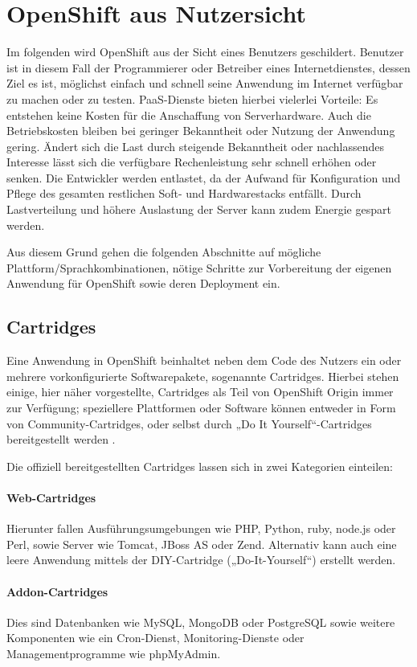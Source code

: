 \documentclass[10pt,a4paper,compsoc]{IEEEtran}
\begin{document}
\section{OpenShift aus Nutzersicht}
\label{sec:user}
Im folgenden wird OpenShift aus der Sicht eines Benutzers geschildert. Benutzer ist in diesem Fall der Programmierer oder Betreiber eines Internetdienstes, dessen Ziel es ist, möglichst einfach und schnell seine Anwendung im Internet verfügbar zu machen oder zu testen. PaaS-Dienste bieten hierbei vielerlei Vorteile:
Es entstehen keine Kosten für die Anschaffung von Serverhardware. Auch die Betriebskosten bleiben bei geringer Bekanntheit oder Nutzung der Anwendung gering.
Ändert sich die Last durch steigende Bekanntheit oder nachlassendes Interesse lässt sich die verfügbare Rechenleistung sehr schnell erhöhen oder senken.
Die Entwickler werden entlastet, da der Aufwand für Konfiguration und Pflege des gesamten restlichen Soft- und Hardwarestacks entfällt.
Durch Lastverteilung und höhere Auslastung der Server kann zudem Energie gespart werden.

Aus diesem Grund gehen die folgenden Abschnitte auf mögliche Plattform/Sprachkombinationen, nötige Schritte zur Vorbereitung der eigenen Anwendung für OpenShift sowie deren Deployment ein. 

\subsection{Cartridges}
Eine Anwendung in OpenShift beinhaltet neben dem Code des Nutzers ein oder mehrere vorkonfigurierte Softwarepakete, sogenannte Cartridges. Hierbei stehen einige, hier näher vorgestellte, Cartridges als Teil von OpenShift Origin immer zur Verfügung; speziellere Plattformen oder Software können entweder in Form von Community-Cartridges, oder selbst durch „Do It Yourself“-Cartridges bereitgestellt werden \cite{os_cartridge}.

Die offiziell bereitgestellten Cartridges lassen sich in zwei Kategorien einteilen:

\paragraph*{Web-Cartridges}
Hierunter fallen Ausführungsumgebungen wie PHP, Python, ruby, node.js oder Perl, sowie Server wie Tomcat, JBoss AS oder Zend. Alternativ kann auch eine leere Anwendung mittels der DIY-Cartridge („Do-It-Yourself“) erstellt werden.

\paragraph*{Addon-Cartridges} Dies sind Datenbanken wie MySQL, MongoDB oder PostgreSQL sowie weitere Komponenten wie ein Cron-Dienst, Monitoring-Dienste oder Managementprogramme wie phpMyAdmin.
\end{document}
